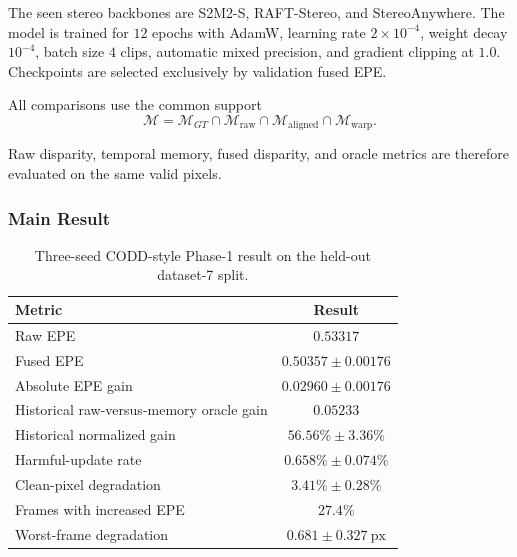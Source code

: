 \documentclass[11pt,a4paper]{article}
\begin{document}
The seen stereo backbones are S2M2-S, RAFT-Stereo, and StereoAnywhere. The model is
trained for \(12\) epochs with AdamW, learning rate \(2\times10^{-4}\), weight decay
\(10^{-4}\), batch size \(4\) clips, automatic mixed precision, and gradient clipping at
\(1.0\). Checkpoints are selected exclusively by validation fused EPE.

All comparisons use the common support
\begin{equation}
    \mathcal{M}
    =
    \mathcal{M}_{GT}
    \cap
    \mathcal{M}_{\mathrm{raw}}
    \cap
    \mathcal{M}_{\mathrm{aligned}}
    \cap
    \mathcal{M}_{\mathrm{warp}}.
    \label{eq:codd_common_support}
\end{equation}

Raw disparity, temporal memory, fused disparity, and oracle metrics are therefore evaluated
on the same valid pixels.

\subsubsection{Main Result}

\begin{table}[t]
    \centering
    \caption{Three-seed CODD-style Phase-1 result on the held-out dataset-7 split.}
    \label{tab:codd_style_configuration_result}
    \begin{tabular}{lc}
        \toprule
        Metric & Result \\
        \midrule
        Raw EPE
            & \(0.53317\) \\
        Fused EPE
            & \(0.50357 \pm 0.00176\) \\
        Absolute EPE gain
            & \(0.02960 \pm 0.00176\) \\
        Historical raw-versus-memory oracle gain
            & \(0.05233\) \\
        Historical normalized gain
            & \(56.56\% \pm 3.36\%\) \\
        Harmful-update rate
            & \(0.658\% \pm 0.074\%\) \\
        Clean-pixel degradation
            & \(3.41\% \pm 0.28\%\) \\
        Frames with increased EPE
            & \(27.4\%\) \\
        Worst-frame degradation
            & \(0.681 \pm 0.327\ \mathrm{px}\) \\
        \bottomrule
    \end{tabular}
\end{table}
\end{document}
